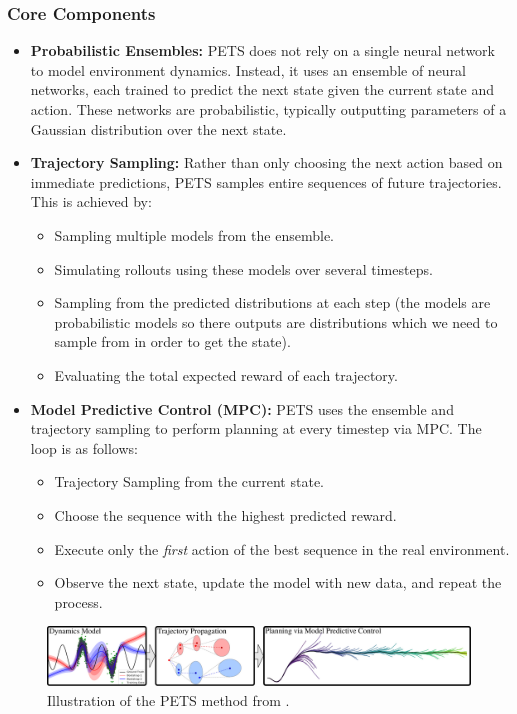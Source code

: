 \subsubsection{Core Components}
\begin{itemize} 
\item \textbf{Probabilistic Ensembles:}
PETS does not rely on a single neural network to model environment dynamics. Instead, it uses an ensemble of neural networks, 
each trained to predict the next state given the current state and action. These networks are probabilistic, typically outputting 
parameters of a Gaussian distribution over the next state. 

\item 
\textbf{Trajectory Sampling:}
Rather than only choosing the next action based on immediate predictions, PETS samples entire sequences of future trajectories. This is achieved by: 
\begin{itemize} 
\item Sampling multiple models from the ensemble. 
\item Simulating rollouts using these models over several timesteps. 
\item Sampling from the predicted distributions at each step (the models are probabilistic models so there outputs are 
distributions which we need to sample from in order to get the state). 
\item Evaluating the total expected reward of each trajectory. 
\end{itemize}

\item \textbf{Model Predictive Control (MPC):}
PETS uses the ensemble and trajectory sampling to perform planning at every timestep via MPC. The loop is as follows: \begin{itemize} 
\item Trajectory Sampling from the current state. 
\item Choose the sequence with the highest predicted reward. 
\item Execute only the \emph{first} action of the best sequence in the real environment. 
\item Observe the next state, update the model with new data, and repeat the process. 
\end{itemize} 
\end{itemize}

\begin{figure}[H]
    \centering
    \includegraphics[width=\linewidth]{images/PETS.pdf}
    \caption{Illustration of the PETS method from \cite{chua2018deepreinforcementlearninghandful}.}
    \label{fig:PETS}
\end{figure}

